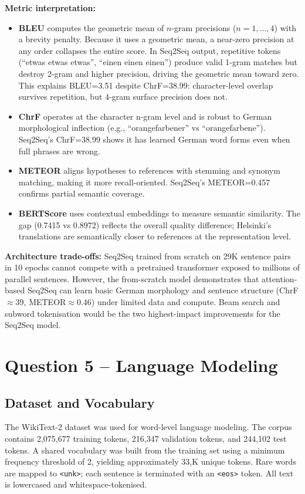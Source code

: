 \documentclass[11pt,a4paper]{article}
\begin{document}
\textbf{Metric interpretation:}
\begin{itemize}
    \item \textbf{BLEU} computes the geometric mean of $n$-gram precisions ($n=1,\ldots,4$) with a brevity penalty. Because it uses a geometric mean, a near-zero precision at any order collapses the entire score. In Seq2Seq output, repetitive tokens (``etwas etwas etwas'', ``einen einen einen'') produce valid 1-gram matches but destroy 2-gram and higher precision, driving the geometric mean toward zero. This explains BLEU=3.51 despite ChrF=38.99: character-level overlap survives repetition, but 4-gram surface precision does not.
    \item \textbf{ChrF} operates at the character n-gram level and is robust to German morphological inflection (e.g., ``orangefarbener'' vs ``orangefarbene''). Seq2Seq's ChrF=38.99 shows it has learned German word forms even when full phrases are wrong.
    \item \textbf{METEOR} aligns hypotheses to references with stemming and synonym matching, making it more recall-oriented. Seq2Seq's METEOR=0.457 confirms partial semantic coverage.
    \item \textbf{BERTScore} uses contextual embeddings to measure semantic similarity. The gap (0.7415 vs 0.8972) reflects the overall quality difference; Helsinki's translations are semantically closer to references at the representation level.
\end{itemize}

\textbf{Architecture trade-offs:} Seq2Seq trained from scratch on 29K sentence pairs in 10 epochs cannot compete with a pretrained transformer exposed to millions of parallel sentences. However, the from-scratch model demonstrates that attention-based Seq2Seq can learn basic German morphology and sentence structure (ChrF$\approx$39, METEOR$\approx$0.46) under limited data and compute. Beam search and subword tokenisation would be the two highest-impact improvements for the Seq2Seq model.

\section{Question 5 -- Language Modeling}

\subsection{Dataset and Vocabulary}

The WikiText-2 dataset was used for word-level language modeling. The corpus contains 2{,}075{,}677 training tokens, 216{,}347 validation tokens, and 244{,}102 test tokens. A shared vocabulary was built from the training set using a minimum frequency threshold of 2, yielding approximately 33{,}K unique tokens. Rare words are mapped to \texttt{<unk>}; each sentence is terminated with an \texttt{<eos>} token. All text is lowercased and whitespace-tokenised.
\end{document}
